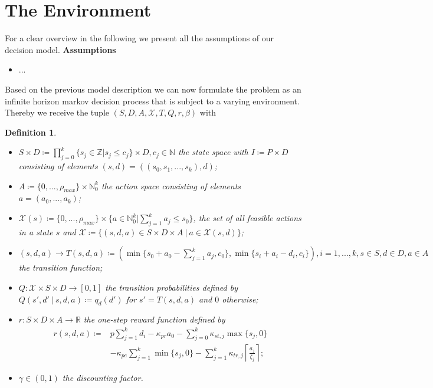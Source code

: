 \documentclass[journal, a4paper]{IEEEtran}
\newtheorem{defi}{Definition}[section]
\begin{document}
\section{The Environment}

For a clear overview in the following we present all the assumptions of our decision model.
\textbf{Assumptions}
\begin{itemize}
	\item[(A1)] ...
\end{itemize}
Based on the previous model description we can now formulate the problem as an infinite horizon markov decision process that is subject to a varying environment. Thereby we receive the tuple $(S, D, A, \mathcal{X}, T, Q, r, \beta)$ with
\begin{defi} \label{def:modell}  \
	\begin{itemize}
		\item[1.] $S \times D \coloneqq \prod\limits_{j=0}^{k} \{s_j \in \mathbb{Z} | s_j \leq c_j\} \times D, c_j \in \mathbb{N}$ the state space with $I \coloneqq P \times D$ consisting of elements $(s,d) = ((s_0, s_1, ... , s_k), d)$;
		\item[2.] $ A \coloneqq  \{0, ..., \rho_{max} \} \times \mathbb{N}_0^k$ the action space consisting of elements $a = (a_0, ..., a_k)$;
		\item[3.] $ \mathcal{X} (s) \coloneqq \{0, ..., \rho_{max} \} \times \{a \in \mathbb{N}_0^k | \sum_{j=1}^{k}a_j \leq s_0  \}$, the set of all feasible actions in a state $s$ and $\mathcal{X} \coloneqq \{(s, d , a) \in S \times D \times A \ | \ a \in \mathcal{X} (s, d)\}$;
		\item[4.] $ (s, d, a) \rightarrow T(s, d, a) \coloneqq (\min\{s_0 + a_0 - \sum_{j=1}^{k}a_j, c_0 \}, \min\{s_i + a_i - d_i, c_i \}), i=1,...,k, s \in S, d \in D, a \in A$ the transition function;	
		\item[5.] $ Q: \mathcal{X} \times S \times D \rightarrow [0,1]  $ the transition probabilities defined by $Q(s', d'\ |\ s, d, a) \coloneqq q_d(d')$ for $s' = T(s, d, a)$ and $0$ otherwise;
		\item[6.] $ r: S \times D \times A \rightarrow \mathbb{R} $ the one-step reward function defined by 
			\begin{equation*}
				\begin{split}
					r(s, d, a) \coloneqq &p \sum_{j=1}^{k}d_i - \kappa_{pr} a_0 - \sum_{j=0}^{k} \kappa_{st, j} \max\{s_j, 0\} \\ 
					&-\kappa_{pe} \sum_{j=1}^{k}\min\{s_j, 0\} - \sum_{j=1}^{k} \kappa_{tr, j} \left\lceil \frac{a_j}{\zeta_j} \right\rceil;
				\end{split}
			\end{equation*}
		\item[7.] $\gamma \in (0, 1) $ the discounting factor.
	\end{itemize}
\end{defi}
\end{document}
